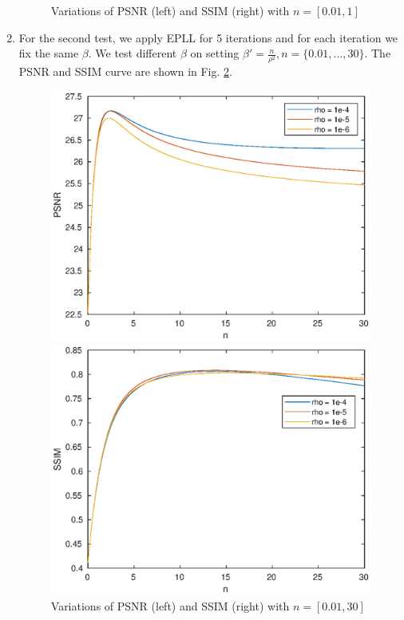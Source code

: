 \documentclass[12pt,a4paper]{article}
\begin{document}
\begin{enumerate}
\begin{figure}[h]
\begin{minipage}[t]{.5\textwidth}
        \end{minipage}
        \caption{Variations of PSNR (left) and SSIM (right) with $n = [0.01,1]$}
        \label{fig:test1 zoom in}
    \end{figure}
    \item For the second test, we apply EPLL for 5 iterations and for each iteration we fix the same $\beta$. We test different $\beta$ on setting $\beta' = \frac{n}{\rho^2}, n = \{0.01,...,30\}$. The PSNR and SSIM curve are shown in Fig. \ref{fig: test2}.
    \begin{figure}[h]
    \begin{minipage}[t]{.5\textwidth}
      \centerline{\includegraphics[scale=0.5]{times_beta_psnr.eps}}
    \end{minipage}
   \begin{minipage}[t]{.5\textwidth}
      \centerline{\includegraphics[scale=0.5]{times_beta_ssim.eps}}
    \end{minipage}
    \caption{Variations of PSNR (left) and SSIM (right) with $n = [0.01,30]$}
    \label{fig: test2}
\end{figure}
\end{enumerate}
\end{document}
